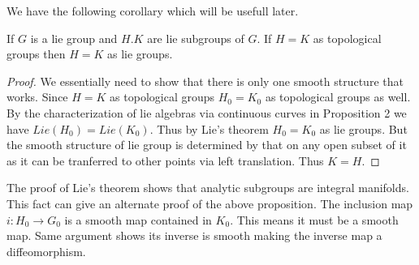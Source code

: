 \documentclass{article}
\begin{document}
We have the following corollary which will be usefull later.

\begin{proposition}
    If $G$ is a lie group and $H.K$ are lie subgroups of $G$. If $H=K$ as topological groups then $H=K$ as lie groups.
\end{proposition}
\begin{proof}
    We essentially need to show that there is only one smooth structure that works. Since $H=K$ as topological groups $H_0=K_0$ as topological groups as well. By the characterization of lie algebras via continuous curves in Proposition 2 we have $Lie(H_0)=Lie(K_0)$.
    Thus by Lie's theorem $H_0=K_0$ as lie groups. But the smooth structure of lie group is determined by that on any open subset of it as it can be tranferred to other points via left translation. Thus $K=H$.
\end{proof}

\begin{remark}
    The proof of Lie's theorem shows that analytic subgroups are integral manifolds. This fact can give an alternate proof of the above proposition. The inclusion map $i:H_0\to G_0$ is a smooth map contained in $K_0$. This means it must be a smooth map. Same argument shows its inverse is smooth
    making the inverse map a diffeomorphism.
\end{remark}
\end{document}
